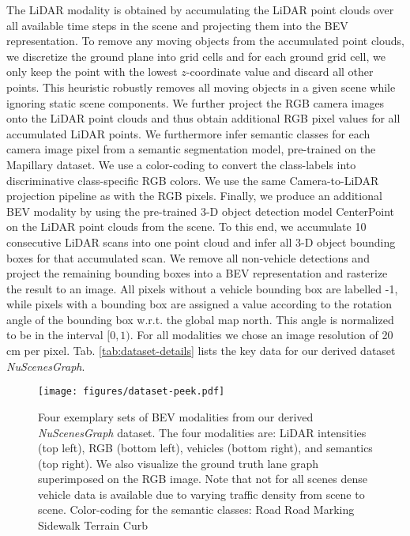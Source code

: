 \documentclass[letterpaper, 10 pt, conference]{ieeeconf}
\begin{document}
The LiDAR modality is obtained by accumulating the LiDAR point clouds over all available time steps in the scene and projecting them into the BEV representation. To remove any moving objects from the accumulated point clouds, we discretize the ground plane into grid cells and for each ground grid cell, we only keep the point with the lowest $z$-coordinate value and discard all other points. This heuristic robustly removes all moving objects in a given scene while ignoring static scene components. We further project the RGB camera images onto the LiDAR point clouds and thus obtain additional RGB pixel values for all accumulated LiDAR points. We furthermore infer semantic classes for each camera image pixel from a semantic segmentation model, pre-trained on the Mapillary dataset. We use a color-coding to convert the class-labels into discriminative class-specific RGB colors. We use the same Camera-to-LiDAR projection pipeline as with the RGB pixels. Finally, we produce an additional BEV modality by using the pre-trained 3-D object detection model CenterPoint \cite{yin2020center} on the LiDAR point clouds from the scene. To this end, we accumulate 10 consecutive LiDAR scans into one point cloud and infer all 3-D object bounding boxes for that accumulated scan. We remove all non-vehicle detections and project the remaining bounding boxes into a BEV representation and rasterize the result to an image. All pixels without a vehicle bounding box are labelled -1, while pixels with a bounding box are assigned a value according to the rotation angle of the bounding box w.r.t. the global map north. This angle is normalized to be in the interval $[0, 1)$. For all modalities we chose an image resolution of 20 cm per pixel. Tab. \ref{tab:dataset-details} lists the key data for our derived dataset \textit{NuScenesGraph}.


\begin{figure}
\centering
\texttt{[image: figures/dataset-peek.pdf]}
\caption{Four exemplary sets of BEV modalities from our derived \textit{NuScenesGraph} dataset. The four modalities are: LiDAR intensities (top left), RGB (bottom left), vehicles (bottom right), and semantics (top right). We also visualize the ground truth lane graph superimposed on the RGB image. Note that not for all scenes dense vehicle data is available due to varying traffic density from scene to scene. Color-coding for the semantic classes: Road \quad Road Marking \quad Sidewalk \quad Terrain \quad Curb \quad}
\label{fig:dataset-peek}
\end{figure}
\end{document}
